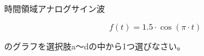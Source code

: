 時間領域アナログサイン波

\[
f(t) = 1.5 \cdot \cos( \pi \cdot t)
\]

\bigskip
\noindent  のグラフを選択肢a〜dの中から1つ選びなさい。

